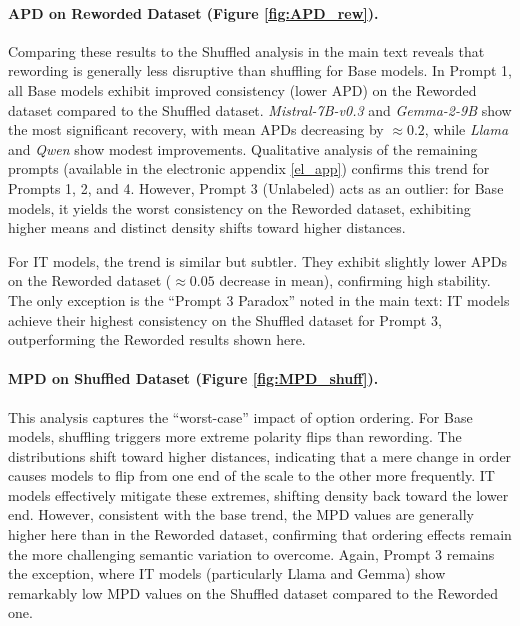 \vspace{-0.4cm}
\paragraph{APD on Reworded Dataset (Figure \ref{fig:APD_rew}).}
Comparing these results to the Shuffled analysis in the main text reveals that rewording is generally less disruptive than shuffling for Base models.
In Prompt 1, all Base models exhibit improved consistency (lower APD) on the Reworded dataset compared to the Shuffled dataset. \textit{Mistral-7B-v0.3} and \textit{Gemma-2-9B} show the most significant recovery, with mean APDs decreasing by $\approx 0.2$, while \textit{Llama} and \textit{Qwen} show modest improvements.
Qualitative analysis of the remaining prompts (available in the electronic appendix \ref{el_app}) confirms this trend for Prompts 1, 2, and 4. However, Prompt 3 (Unlabeled) acts as an outlier: for Base models, it yields the worst consistency on the Reworded dataset, exhibiting higher means and distinct density shifts toward higher distances.

For IT models, the trend is similar but subtler. They exhibit slightly lower APDs on the Reworded dataset ($\approx 0.05$ decrease in mean), confirming high stability. The only exception is the ``Prompt 3 Paradox'' noted in the main text: IT models achieve their highest consistency on the Shuffled dataset for Prompt 3, outperforming the Reworded results shown here.

\vspace{-0.4cm}
\paragraph{MPD on Shuffled Dataset (Figure \ref{fig:MPD_shuff}).}
This analysis captures the ``worst-case'' impact of option ordering.
For Base models, shuffling triggers more extreme polarity flips than rewording. The distributions shift toward higher distances, indicating that a mere change in order causes models to flip from one end of the scale to the other more frequently.
IT models effectively mitigate these extremes, shifting density back toward the lower end. However, consistent with the base trend, the MPD values are generally higher here than in the Reworded dataset, confirming that ordering effects remain the more challenging semantic variation to overcome. Again, Prompt 3 remains the exception, where IT models (particularly Llama and Gemma) show remarkably low MPD values on the Shuffled dataset compared to the Reworded one.

